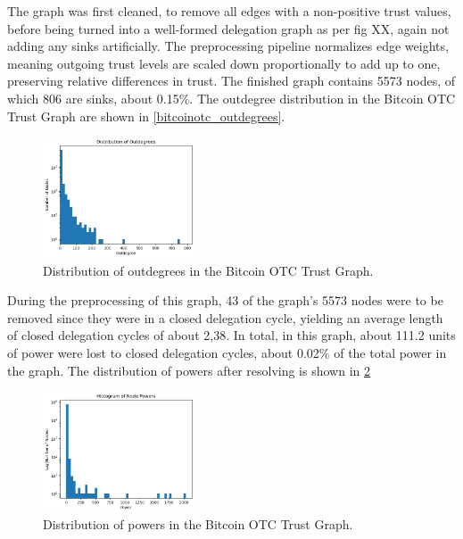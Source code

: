 The graph was first cleaned, to remove all edges with a non-positive trust values, before being turned into a well-formed delegation graph as per fig XX, again not adding any sinks artificially. The preprocessing pipeline normalizes edge weights, meaning outgoing trust levels are scaled down proportionally to add up to one, preserving relative differences in trust. The finished graph contains 5573 nodes, of which 806 are sinks, about 0.15\%. The outdegree distribution in the Bitcoin OTC Trust Graph are shown in \cref{bitcoinotc_outdegrees}.

\begin{figure}[h]
    \centering
    \includegraphics[width=0.4\textwidth]{bitcoinotc_outdegree_distr}
    \caption{Distribution of outdegrees in the Bitcoin OTC Trust Graph.}
    \label{fig:bitcoinotc_outdegrees}
\end{figure}

During the preprocessing of this graph, 43 of the graph's 5573 nodes were to be removed since they were in a closed delegation cycle, yielding an average length of closed delegation cycles of about 2,38. In total, in this graph, about 111.2 units of power were lost to closed delegation cycles, about 0.02\% of the total power in the graph. The distribution of powers after resolving is shown in \cref{fig:bitcoinotc_powers}

 \begin{figure}[h]
    \centering
    \includegraphics[width=0.4\textwidth]{bitcoinotc_power_distr}
    \caption{Distribution of powers in the Bitcoin OTC Trust Graph.}
    \label{fig:bitcoinotc_powers}
\end{figure}

